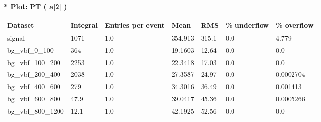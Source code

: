 \documentclass[a4paper, 10pt]{article}
\begin{document}
\textbf{* Plot: PT ( a[2] ) }\\
   \begin{table}[H]
  \begin{center}
    \begin{tabular}{|m{23.0mm}|m{23.0mm}|m{18.0mm}|m{19.0mm}|m{19.0mm}|m{19.0mm}|m{19.0mm}|}
      \hline
      {\cellcolor{yellow}         Dataset}& {\cellcolor{yellow}         Integral}& {\cellcolor{yellow}         Entries per event}& {\cellcolor{yellow}         Mean}& {\cellcolor{yellow}         RMS}& {\cellcolor{yellow}         \% underflow}& {\cellcolor{yellow}         \% overflow}\\
      \hline
      {\cellcolor{white}         signal}& {\cellcolor{white}         1071}& {\cellcolor{white}         1.0}& {\cellcolor{white}         354.913}& {\cellcolor{white}         315.1}& {\cellcolor{green}         0.0}& {\cellcolor{green}         4.779}\\
      \hline
      {\cellcolor{white}         bg\_vbf\_0\_100}& {\cellcolor{white}         364}& {\cellcolor{white}         1.0}& {\cellcolor{white}         19.1603}& {\cellcolor{white}         12.64}& {\cellcolor{green}         0.0}& {\cellcolor{green}         0.0}\\
      \hline
      {\cellcolor{white}         bg\_vbf\_100\_200}& {\cellcolor{white}         2253}& {\cellcolor{white}         1.0}& {\cellcolor{white}         22.3418}& {\cellcolor{white}         17.03}& {\cellcolor{green}         0.0}& {\cellcolor{green}         0.0}\\
      \hline
      {\cellcolor{white}         bg\_vbf\_200\_400}& {\cellcolor{white}         2038}& {\cellcolor{white}         1.0}& {\cellcolor{white}         27.3587}& {\cellcolor{white}         24.97}& {\cellcolor{green}         0.0}& {\cellcolor{green}         0.0002704}\\
      \hline
      {\cellcolor{white}         bg\_vbf\_400\_600}& {\cellcolor{white}         279}& {\cellcolor{white}         1.0}& {\cellcolor{white}         34.3016}& {\cellcolor{white}         36.49}& {\cellcolor{green}         0.0}& {\cellcolor{green}         0.001413}\\
      \hline
      {\cellcolor{white}         bg\_vbf\_600\_800}& {\cellcolor{white}         47.9}& {\cellcolor{white}         1.0}& {\cellcolor{white}         39.0417}& {\cellcolor{white}         45.36}& {\cellcolor{green}         0.0}& {\cellcolor{green}         0.0005266}\\
      \hline
      {\cellcolor{white}         bg\_vbf\_800\_1200}& {\cellcolor{white}         12.1}& {\cellcolor{white}         1.0}& {\cellcolor{white}         42.1925}& {\cellcolor{white}         52.56}& {\cellcolor{green}         0.0}& {\cellcolor{green}         0.0}\\

\end{tabular}
\end{center}
\end{table}
\end{document}
